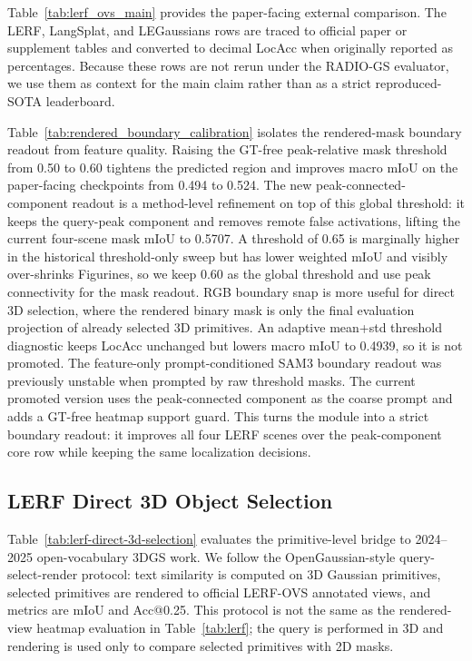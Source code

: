 \documentclass[10pt,twocolumn,letterpaper]{article}
\newcommand{\project}{RADIO-GS}
\begin{document}


Table~\ref{tab:lerf_ovs_main} provides the paper-facing external comparison.
The LERF, LangSplat, and LEGaussians rows are traced to official paper or
supplement tables and converted to decimal LocAcc when originally reported as
percentages. Because these rows are not rerun under the \project{} evaluator, we
use them as context for the main claim rather than as a strict reproduced-SOTA
leaderboard.



Table~\ref{tab:rendered_boundary_calibration} isolates the rendered-mask
boundary readout from feature quality. Raising the GT-free peak-relative mask
threshold from 0.50 to 0.60 tightens the predicted region and improves macro
mIoU on the paper-facing checkpoints from 0.494 to 0.524. The new
peak-connected-component readout is a method-level refinement on top of this
global threshold: it keeps the query-peak component and removes remote false
activations, lifting the current four-scene mask mIoU to 0.5707. A threshold of
0.65 is marginally higher in the historical threshold-only sweep but has lower
weighted mIoU and visibly over-shrinks Figurines, so we keep 0.60 as the global
threshold and use peak connectivity for the mask readout.
RGB boundary snap is more useful for direct 3D selection, where the rendered
binary mask is only the final evaluation projection of already selected 3D
primitives. An adaptive mean+std threshold diagnostic keeps LocAcc unchanged
but lowers macro mIoU to 0.4939, so it is not promoted.
The feature-only prompt-conditioned SAM3 boundary readout was previously
unstable when prompted by raw threshold masks. The current promoted version uses
the peak-connected component as the coarse prompt and adds a GT-free heatmap
support guard. This turns the module into a strict boundary readout: it improves
all four LERF scenes over the peak-component core row while keeping the same
localization decisions.

\subsection{LERF Direct 3D Object Selection}



Table~\ref{tab:lerf-direct-3d-selection} evaluates the primitive-level bridge to
2024--2025 open-vocabulary 3DGS work. We follow the OpenGaussian-style
query-select-render protocol: text similarity is computed on 3D Gaussian
primitives, selected primitives are rendered to official LERF-OVS annotated
views, and metrics are mIoU and Acc@0.25. This protocol is not the same as the
rendered-view heatmap evaluation in Table~\ref{tab:lerf}; the query is performed
in 3D and rendering is used only to compare selected primitives with 2D masks.
\end{document}
